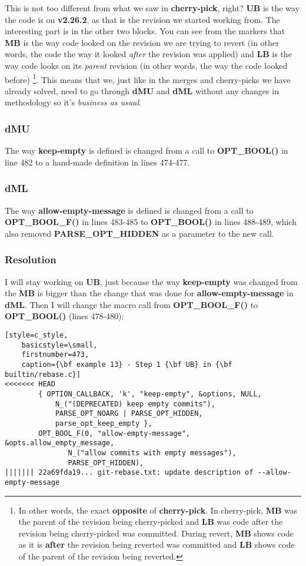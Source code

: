 This is not too different from what we saw in {\bf cherry-pick}, right? {\bf UB} is the way the code is on {\bf v2.26.2}, as that is
the revision we started working from. The interesting part is in the other two blocks. You can see from the markers that {\bf MB}
is the way code looked on the revision we are trying to revert (in other words, the code the way it looked {\it after} the revision was
applied) and {\bf LB} is the way code looks on its {\it parent} revision (in other words, the way the code looked before)
\footnote{In other words, the exact {\bf opposite} of {\bf cherry-pick}. In cherry-pick, {\bf MB} was the parent of the revision
being cherry-picked and {\bf LB} was code after the revision being cherry-picked was committed. During revert, {\bf MB}
shows code as it is {\bf after} the revision being reverted was committed and {\bf LB} shows code of the parent of the revision
being reverted.}. This means that we, just like in the merges and cherry-picks we have already solved, need to go through {\bf dMU} and
{\bf dML} without any changes in methodology so it's {\it business as usual}.

\subsubsection{dMU}
The way {\bf keep-empty} is defined is changed from a call to {\bf OPT\_BOOL()} in line 482 to a hand-made definition in
lines 474-477.

\subsubsection{dML}
The way {\bf allow-empty-message} is defined is changed from a call to {\bf OPT\_BOOL\_F()} in lines 483-485 to
{\bf OPT\_BOOL()} in lines 488-489, which also removed {\bf PARSE\_OPT\_HIDDEN} as a parameter to the new call.

\subsubsection{Resolution}
I will stay working on {\bf UB}, just because the way {\bf keep-empty} was changed from the {\bf MB} is bigger than the
change that was done for {\bf allow-empty-message} in {\bf dML}. Then I will change the macro call from {\bf OPT\_BOOL\_F()}
to {\bf OPT\_BOOL()} (lines 478-480):

\begin{lstlisting}[style=c_style,
	basicstyle=\small,
	firstnumber=473,
	caption={\bf example 13} - Step 1 {\bf UB} in {\bf builtin/rebase.c}]
<<<<<<< HEAD
		{ OPTION_CALLBACK, 'k', "keep-empty", &options, NULL,
			N_("(DEPRECATED) keep empty commits"),
			PARSE_OPT_NOARG | PARSE_OPT_HIDDEN,
			parse_opt_keep_empty },
		OPT_BOOL_F(0, "allow-empty-message", &opts.allow_empty_message,
			   N_("allow commits with empty messages"),
			   PARSE_OPT_HIDDEN),
||||||| 22a69fda19... git-rebase.txt: update description of --allow-empty-message
\end{lstlisting}

